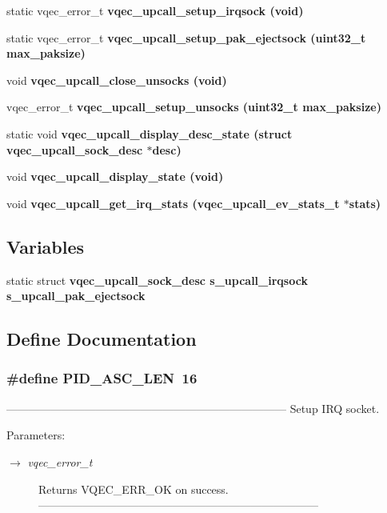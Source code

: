 \begin{CompactItemize}
\item 
static vqec\_\-error\_\-t \bf{vqec\_\-upcall\_\-setup\_\-irqsock} (void)
\item 
static vqec\_\-error\_\-t \bf{vqec\_\-upcall\_\-setup\_\-pak\_\-ejectsock} (uint32\_\-t max\_\-paksize)
\item 
void \bf{vqec\_\-upcall\_\-close\_\-unsocks} (void)
\item 
vqec\_\-error\_\-t \bf{vqec\_\-upcall\_\-setup\_\-unsocks} (uint32\_\-t max\_\-paksize)
\item 
static void \bf{vqec\_\-upcall\_\-display\_\-desc\_\-state} (struct \bf{vqec\_\-upcall\_\-sock\_\-desc} $\ast$desc)
\item 
void \bf{vqec\_\-upcall\_\-display\_\-state} (void)
\item 
void \bf{vqec\_\-upcall\_\-get\_\-irq\_\-stats} (\bf{vqec\_\-upcall\_\-ev\_\-stats\_\-t} $\ast$stats)
\end{CompactItemize}
\subsection*{Variables}
\begin{CompactItemize}
\item 
static struct \bf{vqec\_\-upcall\_\-sock\_\-desc} s\_\-upcall\_\-irqsock \bf{s\_\-upcall\_\-pak\_\-ejectsock}
\end{CompactItemize}


\subsection{Define Documentation}
\subsubsection{\setlength{\rightskip}{0pt plus 5cm}\#define PID\_\-ASC\_\-LEN~16}\label{vqec__upcall__event_8c_2df8c32b858caca63248a310b2f2a00c}


--------------------------------------------------------------------------- Setup IRQ socket.

\begin{Desc}
\item[Parameters:]
\begin{description}
\item[\mbox{$\rightarrow$} {\em vqec\_\-error\_\-t}]Returns VQEC\_\-ERR\_\-OK on success. --------------------------------------------------------------------------- \end{description}
\end{Desc}
